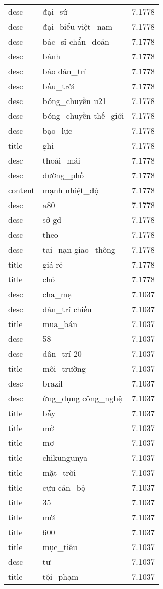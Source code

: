 \documentclass{article}
\begin{document}
\begin{tabular}{lll}
desc & đại\_sứ & 7.1778\\
desc & đại\_biểu việt\_nam & 7.1778\\
desc & bác\_sĩ chẩn\_đoán & 7.1778\\
desc & bánh & 7.1778\\
desc & báo dân\_trí & 7.1778\\
desc & bầu\_trời & 7.1778\\
desc & bóng\_chuyền u21 & 7.1778\\
desc & bóng\_chuyền thế\_giới & 7.1778\\
desc & bạo\_lực & 7.1778\\
title & ghi & 7.1778\\
desc & thoải\_mái & 7.1778\\
desc & đường\_phố & 7.1778\\
content & mạnh nhiệt\_độ & 7.1778\\
desc & a80 & 7.1778\\
desc & sở gd & 7.1778\\
desc & theo & 7.1778\\
desc & tai\_nạn giao\_thông & 7.1778\\
title & giá rẻ & 7.1778\\
title & chó & 7.1778\\
desc & cha\_mẹ & 7.1037\\
desc & dân\_trí chiều & 7.1037\\
title & mua\_bán & 7.1037\\
desc & 58 & 7.1037\\
desc & dân\_trí 20 & 7.1037\\
title & môi\_trường & 7.1037\\
desc & brazil & 7.1037\\
desc & ứng\_dụng công\_nghệ & 7.1037\\
title & bẫy & 7.1037\\
title & mỡ & 7.1037\\
title & mơ & 7.1037\\
title & chikungunya & 7.1037\\
title & mặt\_trời & 7.1037\\
title & cựu cán\_bộ & 7.1037\\
title & 35 & 7.1037\\
title & mời & 7.1037\\
title & 600 & 7.1037\\
title & mục\_tiêu & 7.1037\\
desc & tư & 7.1037\\
title & tội\_phạm & 7.1037\\

\end{tabular}
\end{document}
